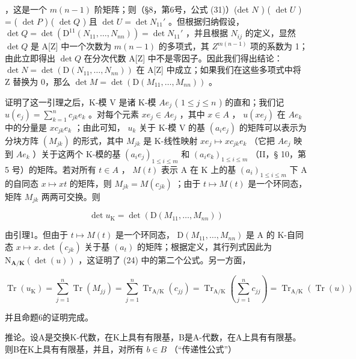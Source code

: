 ，这是一个 \(m(n - 1)\) 阶矩阵；则（§8，第6号，公式 (31)）(det \(N\) ) ( \(\det U\) ) = ( \(\det P\) ) ( \(\det Q\) ) 且 \(\det U = \det N_{11}'\) 。但根据归纳假设， \(\det Q = \det(\mathrm{D}^{11}(N_{11},\ldots ,N_{nn})) = \det N_{11}'\) ，并且根据 \(N_{ij}\) 的定义，显然 \(\det Q\) 是 A{[}Z{]} 中一个次数为 \(m(n - 1)\) 的多项式，其 \(Z^{m(n - 1)}\) 项的系数为 1；由此立即得出 \(\det Q\) 在分次代数 A{[}Z{]} 中不是零因子。因此我们得出结论： \(\det N = \det(\mathrm{D}(N_{11},\ldots ,N_{nn}))\) 在 A{[}Z{]} 中成立；如果我们在这些多项式中将 Z 替换为 0，那么 \(\det M = \det(\mathrm{D}(M_{11},\ldots ,M_{nn}))\) 。

证明了这一引理之后，K-模 V 是诸 K-模 \(Ae_{j}\) ( \(1 \leqslant j \leqslant n\) ) 的直和；我们记 \(u(e_{j}) = \sum_{k=1}^{n} c_{jk} e_{k}\) 。对每个元素 \(xe_{j} \in Ae_{j}\) ，其中 \(x \in A\) ， \(u(xe_{j})\) 在 \(Ae_{k}\) 中的分量是 \(xc_{jk} e_{k}\) ；由此可知， \(u_{k}\) 关于 K-模 V 的基 \((a_{i} e_{j})\) 的矩阵可以表示为分块方阵 \((M_{jk})\) 的形式，其中 \(M_{jk}\) 是 K-线性映射 \(xe_{j} \mapsto xc_{jk} e_{k}\) （它把 \(Ae_{j}\) 映到 \(Ae_{k}\) ）关于这两个 K-模的基 \((a_{i} e_{j})_{1 \leqslant i \leqslant m}\) 和 \((a_{i} e_{k})_{1 \leqslant i \leqslant m}\) （II，§ 10，第 5 号）的矩阵。若对所有 \(t \in A\) ， \(M(t)\) 表示 A 在 K 上的基 \((a_{i})_{1 \leqslant i \leqslant m}\) 下 A 的自同态 \(x \mapsto xt\) 的矩阵，则 \(M_{jk} = M(c_{jk})\) ；由于 \(t \mapsto M(t)\) 是一个环同态，矩阵 \(M_{jk}\) 两两可交换。则

\[
\det u _ {\mathrm{K}} = \det (\mathrm{D} (M _ {1 1}, \dots , M _ {n n}))
\]

由引理1。但由于 \(t \mapsto M(t)\) 是一个环同态， \(\mathrm{D}(M_{11},\ldots ,M_{nn})\) 是 A 的 K-自同态 \(x \mapsto x.\det (c_{jk})\) 关于基 \((a_t)\) 的矩阵；根据定义，其行列式因此为 \(\mathrm{N}_{\mathbf{A} / \mathbf{K}}(\det (u))\) ，这证明了 (24) 中的第二个公式。另一方面，

\[
\operatorname{Tr} \left(u _ {\mathrm{K}}\right) = \sum_ {j = 1} ^ {n} \operatorname{Tr} \left(M _ {j j}\right) = \sum_ {j = 1} ^ {n} \operatorname{Tr} _ {\mathrm{A} / \mathrm{K}} \left(c _ {j j}\right) = \operatorname{Tr} _ {\mathrm{A} / \mathrm{K}} \left(\sum_ {j = 1} ^ {n} c _ {j j}\right) = \operatorname{Tr} _ {\mathrm{A} / \mathrm{K}} (\operatorname{Tr} (u))
\]

并且命题6的证明完成。

推论。设A是交换K-代数，在K上具有有限基，B是A-代数，在A上具有有限基。则B在K上具有有限基，并且，对所有 \(b \in B\) （“传递性公式”）

